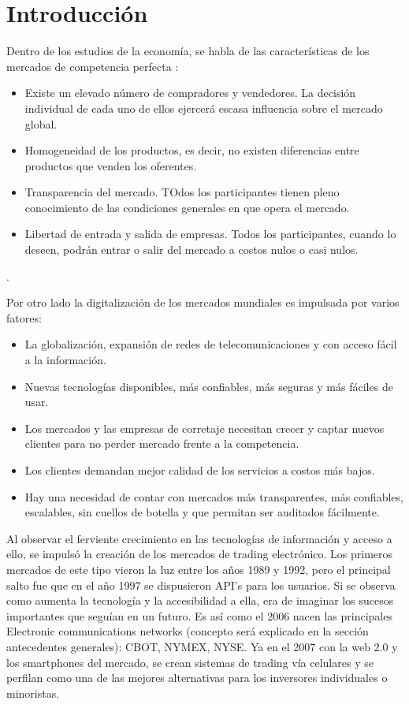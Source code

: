 \section{Introducción}
Dentro de los estudios de la economía, se habla de las características de los mercados de competencia perfecta \cite{mankiw2011principles}:
\begin{itemize}
	\item Existe un elevado número de compradores y vendedores. La decisión individual de cada uno de ellos ejercerá escasa influencia sobre el mercado global.
	\item Homogeneidad de los productos, es decir, no existen diferencias entre productos que venden los oferentes.
	\item Transparencia del mercado. TOdos los participantes tienen pleno conocimiento de las condiciones generales en que opera el mercado.
	\item Libertad de entrada y salida de empresas. Todos los participantes, cuando lo deseen, podrán entrar o salir del mercado a costos nulos o casi nulos.
\end{itemize}.

Por otro lado la digitalización de los mercados mundiales es impulsada por varios fatores:
\begin{itemize}
	\item La globalización, expansión de redes de telecomunicaciones y con acceso fácil a la información.
	\item Nuevas tecnologías disponibles, más confiables, más seguras y más fáciles de usar.
	\item Los mercados y las empresas de corretaje necesitan crecer y captar nuevos clientes para no perder mercado frente a la competencia.
	\item Los clientes demandan mejor calidad de los servicios a costos más bajos.
	\item Hay una necesidad de contar con mercados más transparentes, más confiables, escalables, sin cuellos de botella y que permitan ser auditados fácilmente.
\end{itemize}

Al observar el ferviente crecimiento en las tecnologías de información y acceso a ello, se impulsó la creación de los mercados de trading electrónico. Los primeros
mercados de este tipo vieron la luz entre los años 1989 y 1992, pero el principal salto fue que en el año 1997 se dispusieron API's para los usuarios. Si se observa
como aumenta la tecnología y la accesibilidad a ella, era de imaginar los sucesos importantes que seguían en un futuro. Es así como el 2006 nacen las principales 
Electronic communications networks (concepto será explicado en la sección antecedentes generales): CBOT, NYMEX, NYSE. Ya en el 2007 con la web 2.0 y los smartphones 
del mercado, se crean sistemas de trading vía celulares y se perfilan como una de las mejores alternativas para los inversores individuales o minoristas.

